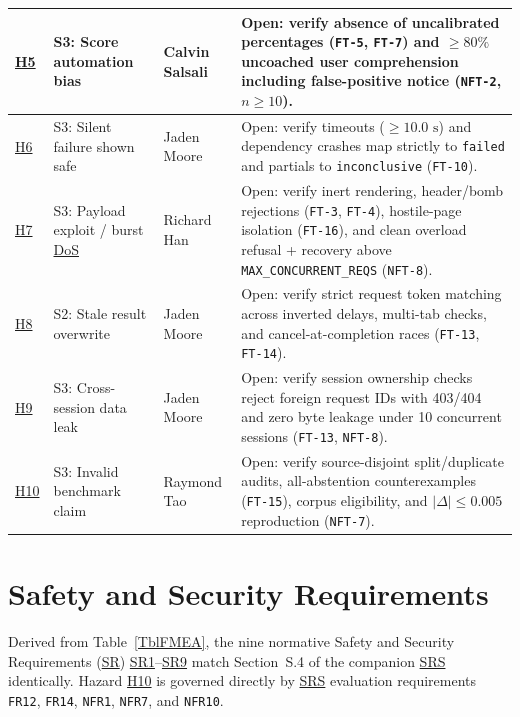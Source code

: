 \documentclass[11pt]{article}
\newcommand{\MaxConcurrentReqs}{\texttt{MAX\_\allowbreak{}CONCURRENT\_\allowbreak{}REQS}}
\newcommand{\DoS}{\hyperlink{ha-acr-dos}{DoS}}
\newcommand{\SR}{\hyperlink{ha-acr-sr}{SR}}
\newcommand{\SRS}{\hyperlink{ha-acr-srs}{SRS}}
\begin{document}
\begin{tabularx}{\textwidth}{P{1.0cm} P{2.8cm} P{2.4cm} Y}
\midrule
\hyperref[haz:H5]{H5} & S3: Score automation bias & Calvin Salsali & Open: verify absence of uncalibrated percentages (\texttt{FT-5}, \texttt{FT-7}) and $\ge 80\%$ uncoached user comprehension including false-positive notice (\texttt{NFT-2}, $n \ge 10$).\\
\midrule
\hyperref[haz:H6]{H6} & S3: Silent failure shown safe & Jaden Moore & Open: verify timeouts ($\ge 10.0\text{ s}$) and dependency crashes map strictly to \texttt{failed} and partials to \texttt{inconclusive} (\texttt{FT-10}).\\
\midrule
\hyperref[haz:H7]{H7} & S3: Payload exploit / burst \DoS{} & Richard Han & Open: verify inert rendering, header/bomb rejections (\texttt{FT-3}, \texttt{FT-4}), hostile-page isolation (\texttt{FT-16}), and clean overload refusal + recovery above \MaxConcurrentReqs{} (\texttt{NFT-8}).\\
\midrule
\hyperref[haz:H8]{H8} & S2: Stale result overwrite & Jaden Moore & Open: verify strict request token matching across inverted delays, multi-tab checks, and cancel-at-completion races (\texttt{FT-13}, \texttt{FT-14}).\\
\midrule
\hyperref[haz:H9]{H9} & S3: Cross-session data leak & Jaden Moore & Open: verify session ownership checks reject foreign request IDs with 403/404 and zero byte leakage under 10 concurrent sessions (\texttt{FT-13}, \texttt{NFT-8}).\\
\midrule
\hyperref[haz:H10]{H10} & S3: Invalid benchmark claim & Raymond Tao & Open: verify source-disjoint split/duplicate audits, all-abstention counterexamples (\texttt{FT-15}), corpus eligibility, and $|\Delta| \le 0.005$ reproduction (\texttt{NFT-7}).\\
\end{tabularx}

\section{Safety and Security Requirements}\label{sec:safety-reqs}

Derived from Table~\ref{TblFMEA}, the nine normative Safety and Security Requirements (\SR{}) \hyperref[SR1]{SR1}--\hyperref[SR9]{SR9} match Section~S.4 of the companion \SRS{} \cite{VeritySRS2026} identically. Hazard \hyperref[haz:H10]{H10} is governed directly by \SRS{} evaluation requirements \texttt{FR12}, \texttt{FR14}, \texttt{NFR1}, \texttt{NFR7}, and \texttt{NFR10}.
\end{document}
